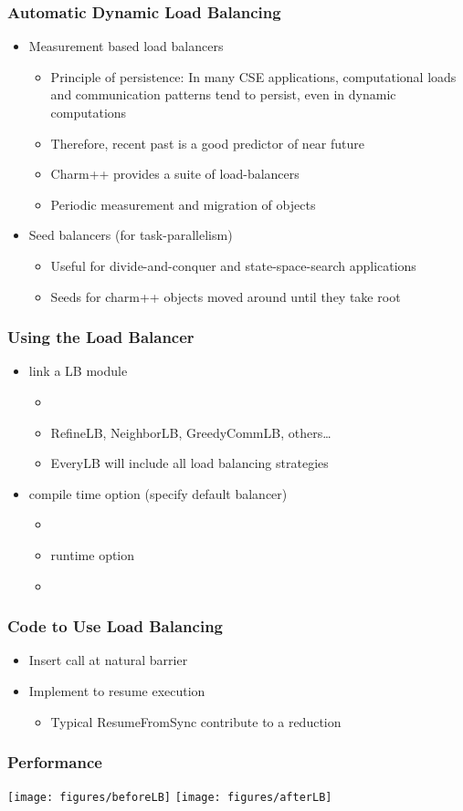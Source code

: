 \begin{frame}[fragile]
\frametitle{Automatic Dynamic Load Balancing}
\begin{itemize}
\item Measurement based load balancers
\begin{itemize}
\item Principle of persistence: In many CSE applications, computational loads and communication patterns tend to persist, even in dynamic computations
\item Therefore, recent past is a good predictor of near future
\item Charm++ provides a suite of load-balancers 
\item Periodic measurement and migration of objects
\end{itemize}
\item Seed balancers (for task-parallelism)
\begin{itemize}
\item Useful for divide-and-conquer and state-space-search applications
\item Seeds for charm++ objects moved around until they take root
\end{itemize}
\end{itemize}
\end{frame}

\begin{frame}[fragile]
\frametitle{Using the Load Balancer}
\begin{itemize}
\item link a LB module 
\begin{itemize}
\item {}
\item RefineLB, NeighborLB, GreedyCommLB, others…
\item EveryLB will include all load balancing strategies
\end{itemize}
\item compile time option (specify default balancer)
\begin{itemize}
\item {}
\item runtime option
\item {}
\end{itemize}
\end{itemize}
\end{frame}

\begin{frame}
\frametitle{Code to Use Load Balancing}
\begin{itemize}
\item Insert  call at natural barrier
\item Implement  to resume execution
\begin{itemize}
\item Typical ResumeFromSync contribute to a reduction
\end{itemize}
\end{itemize}
\end{frame}

\begin{frame}
\frametitle{Performance}
\begin{centering}
\texttt{[image: figures/beforeLB]}
\texttt{[image: figures/afterLB]}
\end{centering}
\end{frame}
